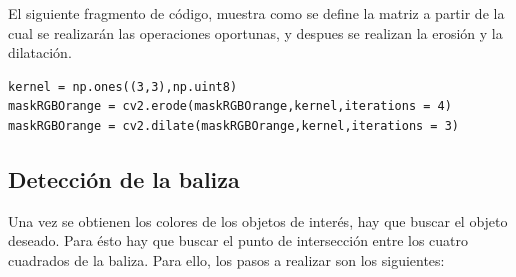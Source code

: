 \hspace{1 cm} El siguiente fragmento de c\'odigo, muestra como se define la matriz a partir de la cual se realizar\'an las operaciones oportunas, y despues se realizan la erosi\'on y la dilataci\'on.
\begin{lstlisting}[backgroundcolor=\color{yellow}]
kernel = np.ones((3,3),np.uint8)
maskRGBOrange = cv2.erode(maskRGBOrange,kernel,iterations = 4)
maskRGBOrange = cv2.dilate(maskRGBOrange,kernel,iterations = 3)
\end{lstlisting}


\subsection{Detecci\'on de la baliza}
\hspace{1 cm} Una vez se obtienen los colores de los objetos de inter\'es, hay que buscar el objeto deseado. Para \'esto hay que buscar el punto de intersecci\'on entre los cuatro cuadrados de la baliza. Para ello, los pasos a realizar son los siguientes:

